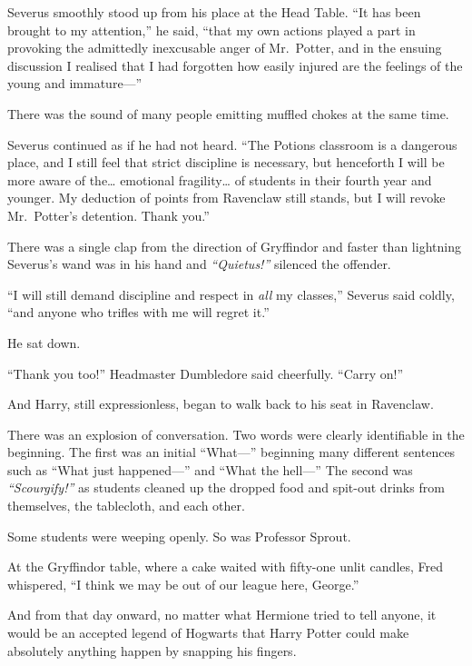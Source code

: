 Severus smoothly stood up from his place at the Head Table. ``It has
been brought to my attention,'' he said, ``that my own actions played a
part in provoking the admittedly inexcusable anger of Mr.~Potter, and in
the ensuing discussion I realised that I had forgotten how easily
injured are the feelings of the young and immature---''

There was the sound of many people emitting muffled chokes at the same
time.

Severus continued as if he had not heard. ``The Potions classroom is a
dangerous place, and I still feel that strict discipline is necessary,
but henceforth I will be more aware of the\ldots{} emotional
fragility\ldots{} of students in their fourth year and younger. My
deduction of points from Ravenclaw still stands, but I will revoke
Mr.~Potter's detention. Thank you.''

There was a single clap from the direction of Gryffindor and faster than
lightning Severus's wand was in his hand and \emph{``Quietus!''}
silenced the offender.

``I will still demand discipline and respect in \emph{all} my classes,''
Severus said coldly, ``and anyone who trifles with me will regret it.''

He sat down.

``Thank you too!'' Headmaster Dumbledore said cheerfully. ``Carry on!''

And Harry, still expressionless, began to walk back to his seat in
Ravenclaw.

There was an explosion of conversation. Two words were clearly
identifiable in the beginning. The first was an initial ``What---''
beginning many different sentences such as ``What just happened---'' and
``What the hell---'' The second was \emph{``Scourgify!''} as students
cleaned up the dropped food and spit-out drinks from themselves, the
tablecloth, and each other.

Some students were weeping openly. So was Professor Sprout.

At the Gryffindor table, where a cake waited with fifty-one unlit
candles, Fred whispered, ``I think we may be out of our league here,
George.''

And from that day onward, no matter what Hermione tried to tell anyone,
it would be an accepted legend of Hogwarts that Harry Potter could make
absolutely anything happen by snapping his fingers.
